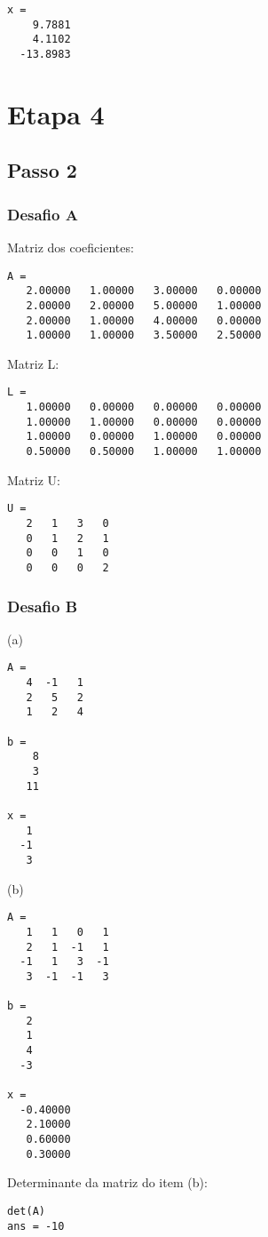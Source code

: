 \documentclass[a4paper]{article}
\begin{document}
\begin{verbatim}
x =
    9.7881
    4.1102
  -13.8983
\end{verbatim}



\section*{Etapa 4}

\subsection*{Passo 2}

\subsubsection*{Desafio A}

Matriz dos coeficientes:

\begin{verbatim}
A =
   2.00000   1.00000   3.00000   0.00000
   2.00000   2.00000   5.00000   1.00000
   2.00000   1.00000   4.00000   0.00000
   1.00000   1.00000   3.50000   2.50000
\end{verbatim}

Matriz L:

\begin{verbatim}
L =
   1.00000   0.00000   0.00000   0.00000
   1.00000   1.00000   0.00000   0.00000
   1.00000   0.00000   1.00000   0.00000
   0.50000   0.50000   1.00000   1.00000
\end{verbatim}

Matriz U:

\begin{verbatim}
U =
   2   1   3   0
   0   1   2   1
   0   0   1   0
   0   0   0   2
\end{verbatim}

\subsubsection*{Desafio B}

(a)

\begin{verbatim}
A =
   4  -1   1
   2   5   2
   1   2   4

b =
    8
    3
   11

x =
   1
  -1
   3
\end{verbatim}

(b)
\begin{verbatim}
A =
   1   1   0   1
   2   1  -1   1
  -1   1   3  -1
   3  -1  -1   3

b =
   2
   1
   4
  -3

x =
  -0.40000
   2.10000
   0.60000
   0.30000
\end{verbatim}

Determinante da matriz do item (b):

\begin{verbatim}
det(A)
ans = -10
\end{verbatim}
\end{document}
